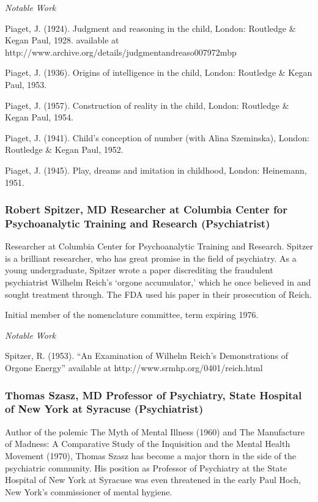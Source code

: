 \begin{refsection}
\emph{Notable Work}

Piaget, J. (1924). Judgment and reasoning in the child, London: Routledge \& Kegan Paul, 1928. available at http:\slash \slash www.archive.org\slash details\slash judgmentandreaso007972mbp

Piaget, J. (1936). Origins of intelligence in the child, London: Routledge \& Kegan Paul, 1953.

Piaget, J. (1957). Construction of reality in the child, London: Routledge \& Kegan Paul, 1954.

Piaget, J. (1941). Child's conception of number (with Alina Szeminska), London: Routledge \& Kegan Paul, 1952.

Piaget, J. (1945). Play, dreams and imitation in childhood, London: Heinemann, 1951.

\subsubsection{Robert Spitzer, MD Researcher at Columbia Center for Psychoanalytic Training and Research (Psychiatrist)}
\label{robertspitzermdresearcheratcolumbiacenterforpsychoanalytictrainingandresearchpsychiatrist}

Researcher at Columbia Center for Psychoanalytic Training and Research. Spitzer is a brilliant researcher, who has great promise in the field of psychiatry. As a young undergraduate, Spitzer wrote a paper discrediting the fraudulent psychiatrist Wilhelm Reich's `orgone accumulator,' which he once believed in and sought treatment through. The FDA used his paper in their prosecution of Reich.

Initial member of the nomenclature committee, term expiring 1976.

\emph{Notable Work}

Spitzer, R. (1953). “An Examination of Wilhelm Reich's Demonstrations of Orgone Energy” available at http:\slash \slash www.srmhp.org\slash 0401\slash reich.html

\subsubsection{Thomas Szasz, MD Professor of Psychiatry, State Hospital of New York at Syracuse (Psychiatrist)}
\label{thomasszaszmdprofessorofpsychiatrystatehospitalofnewyorkatsyracusepsychiatrist}

Author of the polemic The Myth of Mental Illness (1960) and The Manufacture of Madness: A Comparative Study of the Inquisition and the Mental Health Movement (1970), Thomas Szasz has become a major thorn in the side of the psychiatric community. His position as Professor of Psychiatry at the State Hospital of New York at Syracuse was even threatened in the early Paul Hoch, New York’s commissioner of mental hygiene.


\end{refsection}
